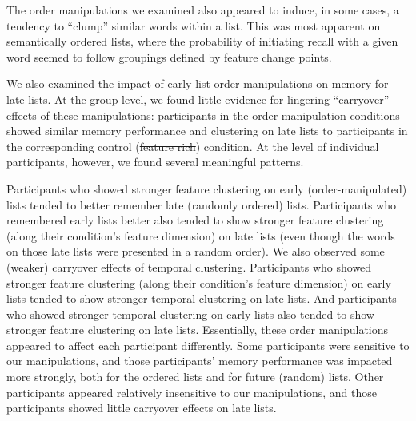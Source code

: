\documentclass[11pt]{article}
\providecommand{\DIFaddtex}[1]{{\protect\color{blue}\uwave{#1}}} %
\providecommand{\DIFdeltex}[1]{{\protect\color{red}\sout{#1}}}                      %
\providecommand{\DIFaddbegin}{} %
\providecommand{\DIFaddend}{} %
\providecommand{\DIFdelbegin}{} %
\providecommand{\DIFdelend}{} %
\providecommand{\DIFadd}[1]{\texorpdfstring{\DIFaddtex{#1}}{#1}} %
\providecommand{\DIFdel}[1]{\texorpdfstring{\DIFdeltex{#1}}{}} %
\newcommand{\DIFscaledelfig}{0.5}
\newlength{\DIFdelgraphicswidth} %
\newlength{\DIFdelgraphicsheight} %
\newcommand{\DIFaddincludegraphics}[2][]{{\color{blue}\fbox{\DIFOincludegraphics[#1]{#2}}}} %
\newcommand{\DIFdelincludegraphics}[2][]{%
\sbox{\DIFdelgraphicsbox}{\DIFOincludegraphics[#1]{#2}}%
\settoboxwidth{\DIFdelgraphicswidth}{\DIFdelgraphicsbox} %
\settoboxtotalheight{\DIFdelgraphicsheight}{\DIFdelgraphicsbox} %
\scalebox{\DIFscaledelfig}{%
\parbox[b]{\DIFdelgraphicswidth}{\usebox{\DIFdelgraphicsbox}\\[-\baselineskip] \rule{\DIFdelgraphicswidth}{0em}}\llap{\resizebox{\DIFdelgraphicswidth}{\DIFdelgraphicsheight}{%
\setlength{\unitlength}{\DIFdelgraphicswidth}%
\begin{picture}(1,1)%
\thicklines\linethickness{2pt} %
{\color[rgb]{1,0,0}\put(0,0){\framebox(1,1){}}}%
{\color[rgb]{1,0,0}\put(0,0){\line( 1,1){1}}}%
{\color[rgb]{1,0,0}\put(0,1){\line(1,-1){1}}}%
\end{picture}%
}\hspace*{3pt}}} %
} %
\DeclareRobustCommand{\DIFaddbegin}{\DIFOaddbegin \let\includegraphics\DIFaddincludegraphics} %
\DeclareRobustCommand{\DIFaddend}{\DIFOaddend \let\includegraphics\DIFOincludegraphics} %
\DeclareRobustCommand{\DIFdelbegin}{\DIFOdelbegin \let\includegraphics\DIFdelincludegraphics} %
\DeclareRobustCommand{\DIFdelend}{\DIFOaddend \let\includegraphics\DIFOincludegraphics} %
\begin{document}
The order manipulations we examined also appeared to induce, in some cases, a
tendency to ``clump'' similar words within a list. This was most apparent on
semantically ordered lists, where the probability of initiating recall with a
given word seemed to follow groupings defined by feature change points.

We also examined the impact of early list order manipulations on memory for
late lists. At the group level, we found little evidence for lingering
``carryover'' effects of these manipulations: participants in the order
manipulation conditions showed similar memory performance and clustering on
late lists to participants in the corresponding control (\DIFdelbegin \DIFdel{feature rich}\DIFdelend \DIFaddbegin \DIFadd{feature-rich}\DIFaddend )
condition. At the level of individual participants, however, we found several
meaningful patterns.

Participants who showed stronger feature clustering on early
(order-manipulated) lists tended to better remember late (randomly ordered)
lists. Participants who remembered early lists better also tended to show
stronger feature clustering (along their condition's feature dimension) on late
lists (even though the words on those late lists were presented in a random
order). We also observed some (weaker) carryover effects of temporal
clustering. Participants who showed stronger feature clustering (along their
condition's feature dimension) on early lists tended to show stronger temporal
clustering on late lists. And participants who showed stronger temporal
clustering on early lists also tended to show stronger feature clustering on
late lists. Essentially, these order manipulations appeared to affect each
participant differently. Some participants were sensitive to our manipulations,
and those participants' memory performance was impacted more strongly, both for
the ordered lists and for future (random) lists. Other participants appeared
relatively insensitive to our manipulations, and those participants showed
little carryover effects on late lists.
\end{document}
